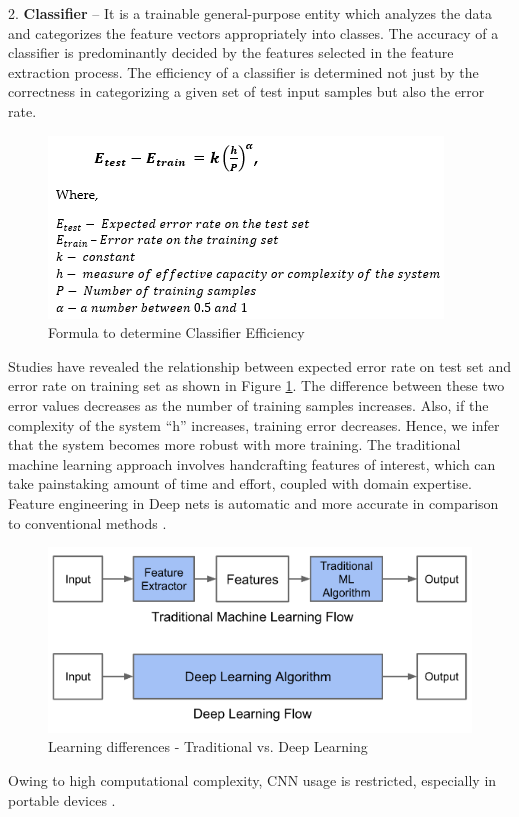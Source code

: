 2.	\textbf{Classifier} – \newline
It is a trainable general-purpose entity which analyzes the data and categorizes the feature vectors appropriately into classes. The accuracy of a classifier is predominantly decided by the features selected in the feature extraction process. \newline
The efficiency of a classifier is determined not just by the correctness in categorizing a given set of test input samples but also the error rate. 
\begin{figure}[h!]
  \centering
  \includegraphics[width=0.7\linewidth]{figures/classifier_efficiency_formula.PNG}
  \caption{Formula to determine Classifier Efficiency
  \cite{lecun1998gradient}}
  \label{fig:classifier_efficiency_formula}
\end{figure}
\newline Studies have revealed the relationship between expected error rate on test set and error rate on training set as shown in Figure \ref{fig:classifier_efficiency_formula}. The difference between these two error values decreases as the number of training samples increases. Also, if the complexity of the system “h” increases, training error decreases. Hence, we infer that the system becomes more robust with more training. 
\newline \newline
The traditional machine learning approach involves handcrafting features of interest, which can take painstaking amount of time and effort, coupled with domain expertise. Feature engineering in Deep nets is automatic and more accurate in comparison to conventional methods \cite{dlintro_am}.
\begin{figure}[h!]
  \centering
  \includegraphics[width=0.7\linewidth]{figures/dlvsml.png}
  \caption{Learning differences - Traditional vs. Deep Learning
  \cite{dlintro_am}}
  \label{fig:deep_learning_flow}
\end{figure}
\newline
Owing to high computational complexity, CNN usage is restricted, especially in portable devices \cite{gysel2016hardware}. 


